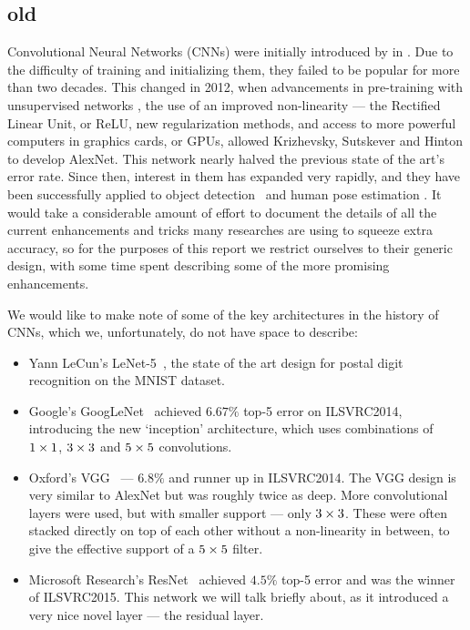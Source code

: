 \subsection{old}
  Convolutional Neural Networks (CNNs) were initially introduced by \citet{lecun_backpropagation_1989} in
  \citep{lecun_backpropagation_1989}. Due to the difficulty of training and
  initializing them, they failed to be popular for more than two decades.  This
  changed in 2012, when advancements in pre-training with unsupervised networks
  \citep{bengio_greedy_2007}, the use of an improved non-linearity --- the Rectified Linear
  Unit, or ReLU, new regularization methods\citep{hinton_improving_2012}, and
  access to more powerful computers in graphics cards, or GPUs, allowed
  Krizhevsky, Sutskever and Hinton  to develop
  AlexNet\citep{krizhevsky_imagenet_2012}. This network nearly halved the
  previous state of the art's error rate.  Since then, interest in them has
  expanded very rapidly, and they have been successfully applied to object
  detection~\citep{ren_object_2015} and human pose estimation
  \citep{tompson_efficient_2015}. It would take a considerable amount of effort
  to document the details of all the current enhancements and tricks many
  researches are using to squeeze extra accuracy, so for the purposes of this
  report we restrict ourselves to their generic design, with some time spent
  describing some of the more promising enhancements. 
  
  We would like to make note of some of the key architectures
  in the history of CNNs, which we, unfortunately, do not have space to describe:
  \begin{itemize}
    \item Yann LeCun's LeNet-5~\citep{lecun_gradient-based_1998}, the state of the art
      design for postal digit recognition on the MNIST dataset.
    \item Google's GoogLeNet~\citep{szegedy_going_2015} achieved $6.67\%$ top-5
      error on ILSVRC2014, introducing the new `inception' architecture, which
      uses combinations of $1\times 1$, $3\times 3$ and $5\times 5$ convolutions.
    \item Oxford's VGG~\citep{simonyan_very_2014} --- $6.8\%$ and runner up in
      ILSVRC2014. The VGG design is very similar to AlexNet but was roughly
      twice as deep. More convolutional layers were used, but with smaller
      support --- only $3\times 3$. These were often stacked directly on top of
      each other without a non-linearity in between, to give the effective
      support of a $5\times 5$ filter.
    \item Microsoft Research's ResNet~\citep{he_deep_2015} achieved $4.5\%$ top-5 
      error and was the winner of ILSVRC2015. This network we will talk briefly
      about, as it introduced a very nice novel layer --- the residual layer.
  \end{itemize}

